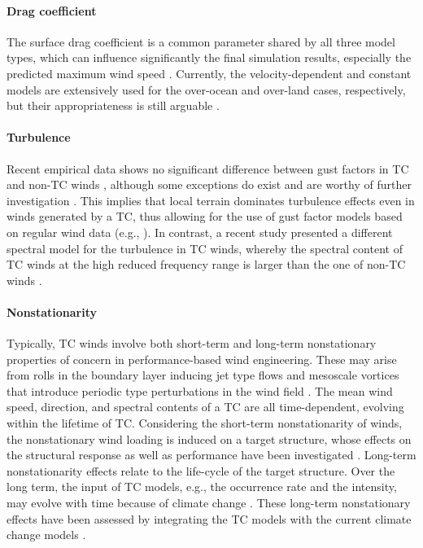 \paragraph{Drag coefficient} The surface drag coefficient is a common parameter shared by all three model types, which can influence significantly the final simulation results, especially the predicted maximum wind speed \citep{li2015observations, powell2003reduced}. Currently, the velocity-dependent and constant models are extensively used for the over-ocean and over-land cases, respectively, but their appropriateness is still arguable \citep{smith2014sensitivity}. 

\paragraph{Turbulence} Recent empirical data shows no significant difference between gust factors in TC and non-TC winds \citep{vickery2009hurricane-a}, although some exceptions do exist and are worthy of further investigation \citep{yu2008hurricane, yu2009gust}. This implies that local terrain dominates turbulence effects even in winds generated by a TC, thus allowing for the use of gust factor models based on regular wind data (e.g., \cite{esdu2008strong}). In contrast, a recent study presented a different spectral model for the turbulence in TC winds, whereby the spectral content of TC winds at the high reduced frequency range is larger than the one of non-TC winds \citep{hu2017tropical, li2015turbulence}.

\paragraph{Nonstationarity} Typically, TC winds involve both short-term and long-term nonstationary properties of concern in performance-based wind engineering. These may arise from rolls in the boundary layer inducing jet type flows and mesoscale vortices that introduce periodic type perturbations in the wind field \citep{li2015turbulence, li2019observed, fernandez2019observing, wurman2017damage}. The mean wind speed, direction, and spectral contents of a TC are all time-dependent, evolving within the lifetime of TC. Considering the short-term nonstationarity of winds, the nonstationary wind loading is induced on a target structure, whose effects on the structural response as well as performance have been investigated \citep{kareem2019generalized, kwon2009gustfront, yau2011hurricane}. Long-term nonstationarity effects relate to the life-cycle of the target structure. Over the long term, the input of TC models, e.g., the occurrence rate and the intensity, may evolve with time because of climate change \citep{emanuel2005increasing}. These long-term nonstationary effects have been assessed by integrating the TC models with the current climate change models \citep{emanuel2008hurricanes, lauren2014assessing, lin2015integrated, liu2014projections}.

